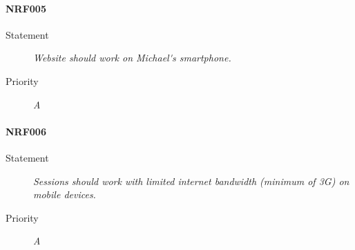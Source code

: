 \paragraph{NRF005}
\begin{description}
  \item [Statement] 
    \textit{Website should work on \gls{Michael's smartphone}.}
  \item [Priority] \textit{A}
\end{description}

\paragraph{NRF006}
\begin{description}
  \item [Statement] 
    \textit{\gls{Session}s should work with limited internet bandwidth (minimum of \gls{3G}) on mobile devices.}
  \item [Priority] \textit{A}
\end{description}
